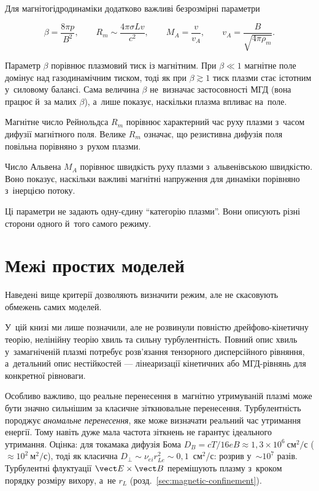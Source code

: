 Для магнітогідродинаміки додатково важливі безрозмірні параметри

\begin{equation}
\beta=\frac{8\pi p}{B^2},
\qquad
R_m\sim\frac{4\pi\sigma Lv}{c^2},
\qquad
M_A=\frac{v}{v_A},
\qquad
v_A=\frac{B}{\sqrt{4\pi\rho_m}}.
\label{eq:plasma-mhd-parameters}
\end{equation}

Параметр $\beta$ порівнює плазмовий тиск із магнітним. При
$\beta\ll1$ магнітне поле домінує над газодинамічним тиском, тоді як
при $\beta\gtrsim1$ тиск плазми стає істотним у~силовому балансі. Сама величина $\beta$ не~визначає
застосовності МГД (вона працює й~за малих $\beta$), а~лише показує, наскільки плазма
впливає на~поле.

Магнітне число Рейнольдса $R_m$ порівнює характерний час руху плазми
з~часом дифузії магнітного поля. Велике $R_m$ означає, що резистивна
дифузія поля повільна порівняно з~рухом плазми.

Число Альвена $M_A$ порівнює швидкість руху плазми з~альвенівською
швидкістю. Воно показує, наскільки важливі магнітні напруження для
динаміки порівняно з~інерцією потоку.

Ці параметри не задають одну-єдину \enquote{категорію плазми}. Вони описують
різні сторони одного й~того самого режиму.

\section{Межі простих моделей}

Наведені вище критерії дозволяють визначити режим, але не скасовують
обмежень самих моделей.

У~цій книзі ми лише позначили, але не розвинули повністю
дрейфово-кінетичну теорію, нелінійну теорію хвиль та сильну
турбулентність. Повний опис хвиль у~замагніченій плазмі потребує розв'язання
тензорного дисперсійного рівняння, а~детальний опис нестійкостей ---
лінеаризації кінетичних або МГД-рівнянь для конкретної рівноваги.

Особливо важливо, що реальне перенесення в~магнітно утримуваній плазмі
може бути значно сильнішим за класичне зіткнювальне перенесення.
Турбулентність породжує \emph{аномальне перенесення}, яке може визначати
реальний час утримання енергії. Тому навіть дуже мала частота
зіткнень не гарантує ідеального утримання. Оцінка: для токамака дифузія Бома $D_B=cT/16eB\approx1{,}3\times10^{6}~\mathrm{см}^2/\mathrm{с}$ ($\approx10^{2}~\mathrm{м}^2/\mathrm{с}$),
тоді як класична $D_\perp\sim\nu_{ei}r_{Le}^2\sim0{,}1$~см$^2$/с: розрив у~$\sim10^{7}$ разів. Турбулентні флуктуації $\vect E\times\vect B$ перемішують плазму
з~кроком порядку розміру вихору, а~не $r_L$ (розд.~\ref{sec:magnetic-confinement}).


